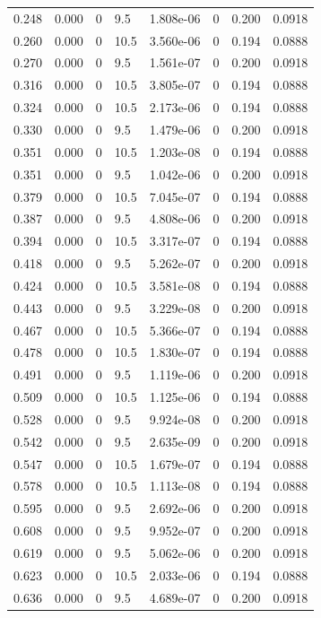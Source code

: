 \documentclass[preview]{standalone}
\begin{document}
{{\begin{tabular}{L{1.2cm}C{1.2cm} C{0.3cm}C{0.5cm} C{1.4cm}C{1.4cm} C{1.4cm}C{1.4cm}}
  0.248  &  0.000  & 0     & 9.5 &  1.808e-06  & 0  & 0.200 &  0.0918   \\ 
  0.260  &  0.000  & 0     & 10.5 &  3.560e-06  & 0  & 0.194 &  0.0888   \\ 
  0.270  &  0.000  & 0     & 9.5 &  1.561e-07  & 0  & 0.200 &  0.0918   \\ 
  0.316  &  0.000  & 0     & 10.5 &  3.805e-07  & 0  & 0.194 &  0.0888   \\ 
  0.324  &  0.000  & 0     & 10.5 &  2.173e-06  & 0  & 0.194 &  0.0888   \\ 
  0.330  &  0.000  & 0     & 9.5 &  1.479e-06  & 0  & 0.200 &  0.0918   \\ 
  0.351  &  0.000  & 0     & 10.5 &  1.203e-08  & 0  & 0.194 &  0.0888   \\ 
  0.351  &  0.000  & 0     & 9.5 &  1.042e-06  & 0  & 0.200 &  0.0918   \\ 
  0.379  &  0.000  & 0     & 10.5 &  7.045e-07  & 0  & 0.194 &  0.0888   \\ 
  0.387  &  0.000  & 0     & 9.5 &  4.808e-06  & 0  & 0.200 &  0.0918   \\ 
  0.394  &  0.000  & 0     & 10.5 &  3.317e-07  & 0  & 0.194 &  0.0888   \\ 
  0.418  &  0.000  & 0     & 9.5 &  5.262e-07  & 0  & 0.200 &  0.0918   \\ 
  0.424  &  0.000  & 0     & 10.5 &  3.581e-08  & 0  & 0.194 &  0.0888   \\ 
  0.443  &  0.000  & 0     & 9.5 &  3.229e-08  & 0  & 0.200 &  0.0918   \\ 
  0.467  &  0.000  & 0     & 10.5 &  5.366e-07  & 0  & 0.194 &  0.0888   \\ 
  0.478  &  0.000  & 0     & 10.5 &  1.830e-07  & 0  & 0.194 &  0.0888   \\ 
  0.491  &  0.000  & 0     & 9.5 &  1.119e-06  & 0  & 0.200 &  0.0918   \\ 
  0.509  &  0.000  & 0     & 10.5 &  1.125e-06  & 0  & 0.194 &  0.0888   \\ 
  0.528  &  0.000  & 0     & 9.5 &  9.924e-08  & 0  & 0.200 &  0.0918   \\ 
  0.542  &  0.000  & 0     & 9.5 &  2.635e-09  & 0  & 0.200 &  0.0918   \\ 
  0.547  &  0.000  & 0     & 10.5 &  1.679e-07  & 0  & 0.194 &  0.0888   \\ 
  0.578  &  0.000  & 0     & 10.5 &  1.113e-08  & 0  & 0.194 &  0.0888   \\ 
  0.595  &  0.000  & 0     & 9.5 &  2.692e-06  & 0  & 0.200 &  0.0918   \\ 
  0.608  &  0.000  & 0     & 9.5 &  9.952e-07  & 0  & 0.200 &  0.0918   \\ 
  0.619  &  0.000  & 0     & 9.5 &  5.062e-06  & 0  & 0.200 &  0.0918   \\ 
  0.623  &  0.000  & 0     & 10.5 &  2.033e-06  & 0  & 0.194 &  0.0888   \\ 
  0.636  &  0.000  & 0     & 9.5 &  4.689e-07  & 0  & 0.200 &  0.0918   \\ 
\hline 
\end{tabular} 

}}
\end{document}
